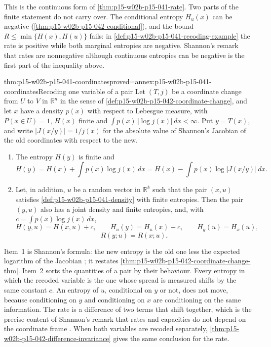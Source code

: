This is the continuous form of \cref{thm:p15-w02b-p15-041-rate}. Two
parts of the finite statement do not carry over. The conditional
entropy \(H_u(x)\) can be negative
(\cref{thm:p15-w02b-p15-042-conditional}), and the bound
\(R\leq\min\{H(x),H(u)\}\) fails: in
\cref{def:p15-w02b-p15-041-recoding-example} the rate is positive while
both marginal entropies are negative. Shannon's remark that rates are
nonnegative although continuous entropies can be negative
\cite[p.~38]{Shannon1948MathematicalTheory} is the first part of the
inequality above.

\begin{hbtheorem}{thm:p15-w02b-p15-041-coordinates}{proved=annex:p15-w02b-p15-041-coordinates}{Recoding one variable of a pair}
Let \((T,j)\) be a coordinate change from \(U\) to \(V\) in
\(\mathbb R^n\) in the sense of
\cref{def:p15-w02b-p15-042-coordinate-change}, and let \(x\) have a
density \(p(x)\) with respect to Lebesgue measure, with
\(P(x\in U)=1\), \(H(x)\) finite and
\(\int p(x)\,|\log j(x)|\,dx<\infty\). Put \(y=T(x)\), and write
\(|J(x/y)|=1/j(x)\) for the absolute value of Shannon's Jacobian of the
old coordinates with respect to the new.
\begin{enumerate}
\item The entropy \(H(y)\) is finite and
\[
 H(y)=H(x)+\int p(x)\log j(x)\,dx=H(x)-\int p(x)\log|J(x/y)|\,dx .
\]
\item Let, in addition, \(u\) be a random vector in \(\mathbb R^k\) such
that the pair \((x,u)\) satisfies \cref{def:p15-w02b-p15-041-density}
with finite entropies. Then the pair \((y,u)\) also has a joint density
and finite entropies, and, with \(c=\int p(x)\log j(x)\,dx\),
\[
 H(y,u)=H(x,u)+c,\qquad H_u(y)=H_u(x)+c,\qquad H_y(u)=H_x(u),
\]
\[
 R(y;u)=R(x;u).
\]
\end{enumerate}
\end{hbtheorem}

Item~1 is Shannon's formula: the new entropy is the old one less the
expected logarithm of the Jacobian
\cite[pp.~37--38]{Shannon1948MathematicalTheory}; it restates
\cref{thm:p15-w02b-p15-042-coordinate-change-thm}. Item~2 sorts the
quantities of a pair by their behaviour. Every entropy in which the
recoded variable is the one whose spread is measured shifts by the same
constant \(c\). An entropy of \(u\), conditional on \(y\) or not, does not
move, because conditioning on \(y\) and conditioning on \(x\) are
conditioning on the same information. The rate is a difference of two
terms that shift together, which is the precise content of Shannon's
remark that rates and capacities do not depend on the coordinate frame
\cite[p.~38]{Shannon1948MathematicalTheory}. When both variables are
recoded separately, \cref{thm:p15-w02b-p15-042-difference-invariance}
gives the same conclusion for the rate.

